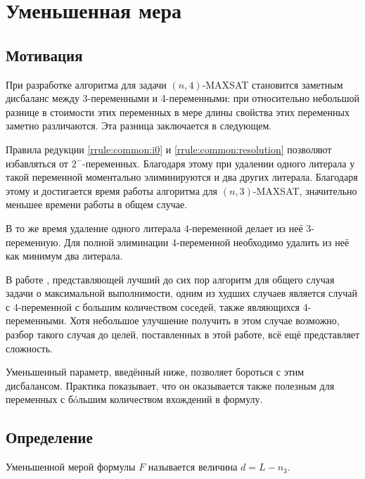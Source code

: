 
\section{Уменьшенная мера}
\label{sec:measure}

\subsection{Мотивация}
\label{subsec:measure:motivation}

\firstpar{}При разработке алгоритма для задачи $(n,4)$-MAXSAT становится заметным дисбаланс между 3-переменными и 4-переменными: при относительно небольшой разнице в стоимости этих переменных в мере длины свойства этих переменных заметно различаются. Эта разница заключается в следующем.

Правила редукции \ref{rrule:common:i0} и \ref{rrule:common:resolution} позволяют избавляться от $2^-$-переменных. Благодаря этому при удалении одного литерала у такой переменной моментально элиминируются и два других литерала. Благодаря этому и достигается время работы алгоритма для $(n,3)$-MAXSAT, значительно меньшее времени работы в общем случае.

В то же время удаление одного литерала 4-переменной делает из неё 3-переменную. Для полной элиминации 4-переменной необходимо удалить из неё как минимум два литерала.

В работе \cite{bansal99}, представляющей лучший до сих пор алгоритм для общего случая задачи о максимальной выполнимости, одним из худших случаев является случай с 4-переменной с большим количеством соседей, также являющихся 4-переменными. Хотя небольшое улучшение получить в этом случае возможно, разбор такого случая до целей, поставленных в этой работе, всё ещё представляет сложность.

Уменьшенный параметр, введённый ниже, позволяет бороться с этим дисбалансом. Практика показывает, что он оказывается также полезным для переменных с бóльшим количеством вхождений в формулу.

\subsection{Определение}
\label{subsec:measure:definition}

\begin{definition}
 Уменьшенной мерой формулы $F$ называется величина $d = L - n_3$.
\end{definition}

